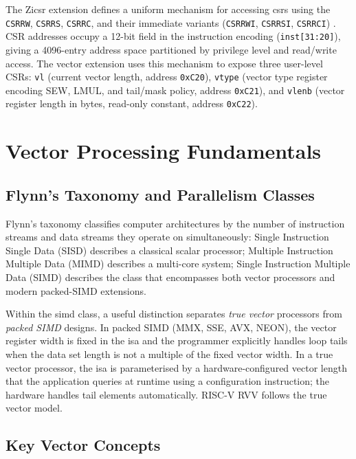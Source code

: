 The Zicsr extension defines a uniform mechanism for accessing \glspl{csr} using the
\texttt{CSRRW}, \texttt{CSRRS}, \texttt{CSRRC}, and their immediate variants
(\texttt{CSRRWI}, \texttt{CSRRSI}, \texttt{CSRRCI}) \cite{riscv-spec-2019}. CSR
addresses occupy a 12-bit field in the instruction encoding (\texttt{inst[31:20]}),
giving a 4096-entry address space partitioned by privilege level and read/write
access. The vector extension uses this mechanism to expose three user-level CSRs:
\texttt{vl} (current vector length, address \texttt{0xC20}), \texttt{vtype} (vector
type register encoding SEW, LMUL, and tail/mask policy, address \texttt{0xC21}), and
\texttt{vlenb} (vector register length in bytes, read-only constant, address \texttt{0xC22}).

\section{Vector Processing Fundamentals}
\label{sec:vector-fundamentals}

\subsection{Flynn's Taxonomy and Parallelism Classes}

Flynn's taxonomy \cite{harris2012digital} classifies computer architectures by the
number of instruction streams and data streams they operate on simultaneously:
Single Instruction Single Data (SISD) describes a classical scalar processor; Multiple
Instruction Multiple Data (MIMD) describes a multi-core system; Single Instruction
Multiple Data (SIMD) describes the class that encompasses both vector processors and
modern packed-SIMD extensions.

Within the \gls{simd} class, a useful distinction separates \emph{true vector} processors
from \emph{packed SIMD} designs. In packed SIMD (MMX, SSE, AVX, NEON), the vector
register width is fixed in the \gls{isa} and the programmer explicitly handles loop
tails when the data set length is not a multiple of the fixed vector width. In a true
vector processor, the \gls{isa} is parameterised by a hardware-configured vector length
that the application queries at runtime using a configuration instruction; the hardware
handles tail elements automatically. RISC-V RVV follows the true vector model.

\subsection{Key Vector Concepts}

